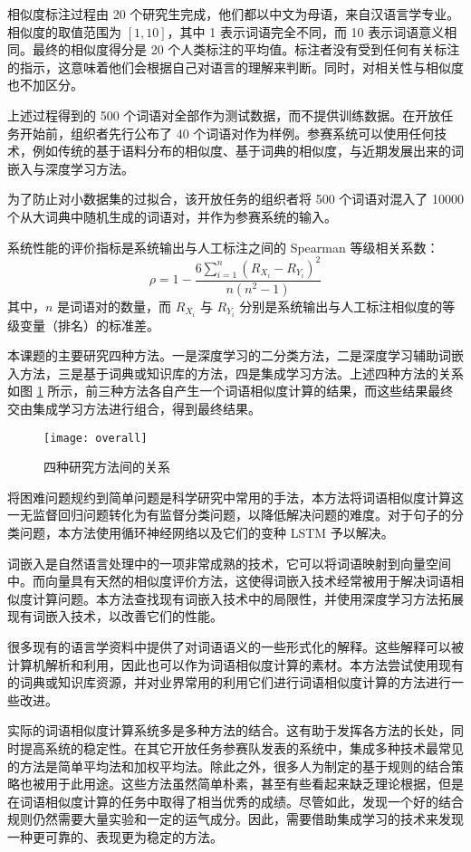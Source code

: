 相似度标注过程由 20 个研究生完成，他们都以中文为母语，来自汉语言学专业。相似度的取值范围为 $[1, 10]$，其中 1 表示词语完全不同，而 10 表示词语意义相同。最终的相似度得分是 20 个人类标注的平均值。标注者没有受到任何有关标注的指示，这意味着他们会根据自己对语言的理解来判断。同时，对相关性与相似度也不加区分。

上述过程得到的 500 个词语对全部作为测试数据，而不提供训练数据。在开放任务开始前，组织者先行公布了 40 个词语对作为样例。参赛系统可以使用任何技术，例如传统的基于语料分布的相似度、基于词典的相似度，与近期发展出来的词嵌入与深度学习方法。

为了防止对小数据集的过拟合，该开放任务的组织者将 500 个词语对混入了 10000 个从大词典中随机生成的词语对，并作为参赛系统的输入。

系统性能的评价指标是系统输出与人工标注之间的 Spearman 等级相关系数：
\begin{equation}
\rho = 1 - \frac{6 \sum_{i = 1}^{n}(R_{X_i} - R_{Y_i})^2}{n(n^2 - 1)}
\end{equation}
其中，$n$ 是词语对的数量，而 $R_{X_i}$ 与 $R_{Y_i}$ 分别是系统输出与人工标注相似度的等级变量（排名）的标准差。


本课题的主要研究四种方法。一是深度学习的二分类方法，二是深度学习辅助词嵌入方法，三是基于词典或知识库的方法，四是集成学习方法。上述四种方法的关系如图 \ref{f:overall} 所示，前三种方法各自产生一个词语相似度计算的结果，而这些结果最终交由集成学习方法进行组合，得到最终结果。

\begin{figure}[h]
	\centering
	\texttt{[image: overall]}
	\caption{四种研究方法间的关系}
	\label{f:overall}
	\vspace{-1em}
\end{figure}

将困难问题规约到简单问题是科学研究中常用的手法，本方法将词语相似度计算这一无监督回归问题转化为有监督分类问题，以降低解决问题的难度。对于句子的分类问题，本方法使用循环神经网络以及它们的变种 LSTM 予以解决。

词嵌入是自然语言处理中的一项非常成熟的技术，它可以将词语映射到向量空间中。而向量具有天然的相似度评价方法，这使得词嵌入技术经常被用于解决词语相似度计算问题。本方法查找现有词嵌入技术中的局限性，并使用深度学习方法拓展现有词嵌入技术，以改善它们的性能。

很多现有的语言学资料中提供了对词语语义的一些形式化的解释。这些解释可以被计算机解析和利用，因此也可以作为词语相似度计算的素材。本方法尝试使用现有的词典或知识库资源，并对业界常用的利用它们进行词语相似度计算的方法进行一些改进。

实际的词语相似度计算系统多是多种方法的结合。这有助于发挥各方法的长处，同时提高系统的稳定性。在其它开放任务参赛队发表的系统中，集成多种技术最常见的方法是简单平均法和加权平均法。除此之外，很多人为制定的基于规则的结合策略也被用于此用途。这些方法虽然简单朴素，甚至有些看起来缺乏理论根据，但是在词语相似度计算的任务中取得了相当优秀的成绩。尽管如此，发现一个好的结合规则仍然需要大量实验和一定的运气成分。因此，需要借助集成学习的技术来发现一种更可靠的、表现更为稳定的方法。